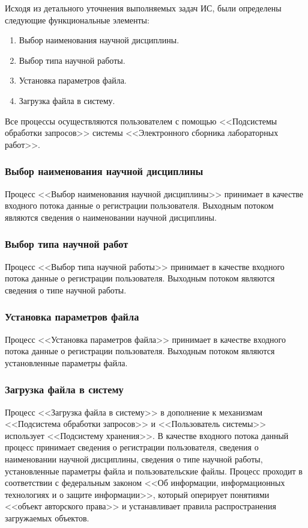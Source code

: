 \documentclass[a4paper,14pt]{extarticle}
\begin{document}
Исходя из детального уточнения выполняемых задач ИС, были определены
следующие функциональные элементы:
\newpage
\begin{enumerate}
	\item Выбор наименования научной дисциплины.
	\item Выбор типа научной работы.
	\item Установка параметров файла.
	\item Загрузка файла в систему.
\end{enumerate}

Все процессы осуществляются пользователем с помощью <<Подсистемы обработки запросов>> системы <<Электронного сборника лабораторных работ>>.

\subsubsection{Выбор наименования научной дисциплины}
Процесс <<Выбор наименования научной дисциплины>> принимает в качестве входного потока данные о регистрации пользователя. Выходным потоком являются сведения о наименовании научной дисциплины. 


\subsubsection{Выбор типа научной работ}
Процесс <<Выбор типа научной работы>> принимает в качестве входного потока данные о регистрации пользователя. Выходным потоком являются сведения о типе научной работы.


\subsubsection{Установка параметров файла}
Процесс <<Установка параметров файла>> принимает в качестве входного потока данные о регистрации пользователя. Выходным потоком являются установленные параметры файла.


\subsubsection{Загрузка файла в систему}
Процесс <<Загрузка файла в систему>> в дополнение к механизмам <<Подсистема обработки запросов>> и <<Пользователь системы>> использует <<Подсистему хранения>>. В качестве входного потока данный процесс принимает сведения о регистрации пользователя, сведения о наименовании научной дисциплины, сведения о типе научной работы, установленные параметры файла и пользовательские файлы. Процесс проходит в соответствии с федеральным законом <<Об информации, информационных технологиях и о защите информации>>, который оперирует понятиями <<объект авторского права>> и устанавливает правила распространения загружаемых объектов.
\end{document}

